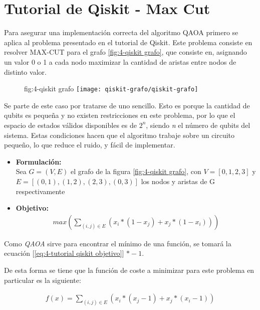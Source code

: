 \section{Tutorial de Qiskit - Max Cut}
\label{sec:4-tutorial de qiskit}

Para asegurar una implementación correcta del algoritmo QAOA primero se aplica al problema presentado en el tutorial de Qiskit.
\cite{qiskit_tutorial_antiguo}
Este problema consiste en resolver MAX-CUT para el grafo \ref{fig:4-qiskit grafo}, que consiste en, asignando un valor 0 o 1 a cada nodo maximizar la cantidad de aristas entre nodos de distinto valor.

\begin{figure}{fig:4-qiskit grafo}{}
  \centering
  \texttt{[image: qiskit-grafo/qiskit-grafo]}
\end{figure}

Se parte de este caso por tratarse de uno sencillo. Esto es porque la cantidad de qubits es pequeña y no existen restricciones en este problema, por lo que el espacio de estados válidos disponibles es de $2^n$, siendo \textit{n} el número de qubits del sistema. Estas condiciones hacen que el algoritmo trabaje sobre un circuito pequeño, lo que reduce el ruido, y fácil de implementar.

\begin{itemize}
\item \textbf{Formulación:} \\
  Sea $G = (V, E)$ el grafo de la figura \ref{fig:4-qiskit grafo}, con $V = [0, 1, 2, 3]$ y $E = [(0, 1), (1, 2), (2, 3), (0, 3)]$ los nodos y aristas de G respectivamente

\item \textbf{Objetivo:} \\
  \begin{align} \label{eq:4-tutorial qiskit objetivo}
    max(\sum_{(i, j) \in E} (x_i * (1 - x_j) + x_j * (1 - x_i)))
  \end{align}

\end{itemize}

Como \textit{QAOA} sirve para encontrar el mínimo de una función, se tomará la ecuación [\ref{eq:4-tutorial qiskit objetivo}] $*-1$.

De esta forma se tiene que la función de coste a minimizar para este problema en particular es la siguiente:

\begin{align*}
  f(x) = \sum_{(i, j) \in E} (x_i * (x_j - 1) + x_j * (x_i - 1))
\end{align*}

